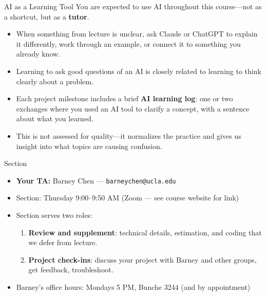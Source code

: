 \documentclass[xcolor=dvipsnames]{beamer}
\newcommand\makebiggaps{\addtolength{\itemsep}{.5\baselineskip}}
\begin{document}
\begin{frame}{AI as a Learning Tool}
\small
{} You are expected to use AI throughout this course---not as a shortcut, but as a \textbf{tutor}.\\
\medskip
\begin{itemize}
\item<2-> When something from lecture is unclear, ask Claude or ChatGPT to explain it differently, work through an example, or connect it to something you already know.
\medskip
\item<3-> Learning to ask good questions of an AI is closely related to learning to think clearly about a problem.
\medskip
\item<4-> Each project milestone includes a brief \textbf{AI learning log}: one or two exchanges where you used an AI tool to clarify a concept, with a sentence about what you learned.
\medskip
\item<5-> This is not assessed for quality---it normalizes the practice and gives us insight into what topics are causing confusion.
\end{itemize}
\end{frame}


\begin{frame}{Section}
\small
\begin{itemize}
\makebiggaps
\item<1-> \textbf{Your TA:} Barney Chen --- \texttt{barneychen@ucla.edu}
\medskip
\item<2-> Section: Thursday 9:00--9:50 AM (Zoom --- see course website for link)
\medskip
\item<3-> Section serves two roles:
  \begin{enumerate}
  \item \textbf{Review and supplement}: technical details, estimation, and coding that we defer from lecture.
  \item \textbf{Project check-ins}: discuss your project with Barney and other groups, get feedback, troubleshoot.
  \end{enumerate}
\medskip
\item<4-> Barney's office hours: Mondays 5 PM, Bunche 3244 (and by appointment)
\end{itemize}
\end{frame}
\end{document}
